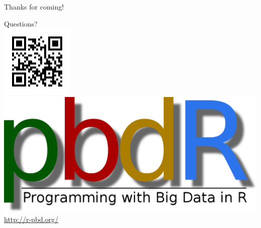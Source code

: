 
\hidenum
\begin{frame}[noframenumbering]
 \begin{block}{Thanks for coming!}
 \begin{center}
 \vspace{.4cm}
     {\Huge Questions?}\\[.8cm]
\includegraphics[scale=.35]{../common/pics/pbdqr}\includegraphics[scale=.1]{../common/pics/logos/newpbdr}
\\
\url{http://r-pbd.org/}
  \end{center}
 \end{block}
\end{frame}
